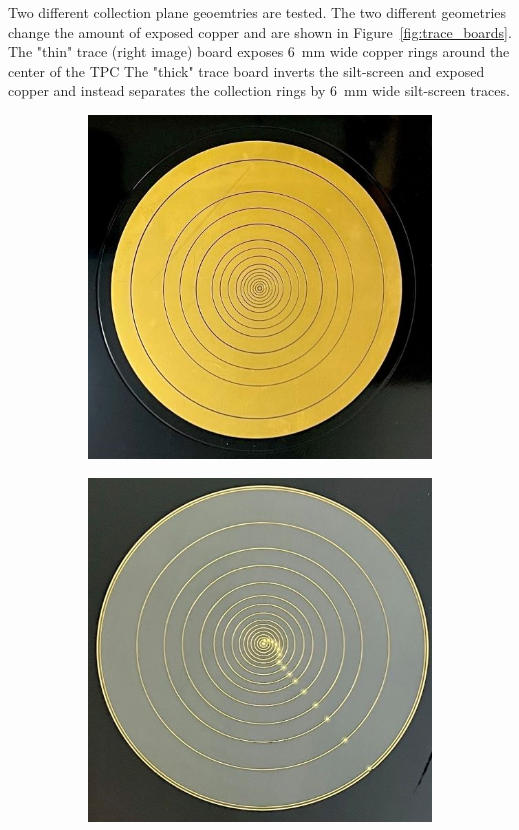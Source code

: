 Two different collection plane geoemtries are tested.
The two different geometries change the amount of exposed copper and are shown in Figure~\ref{fig:trace_boards}.
The "thin" trace (right image) board exposes 6~\unit{mm} wide copper rings around the center of the TPC
The "thick" trace board inverts the silt-screen and exposed copper and instead separates the collection rings by 6~\unit{mm} wide silt-screen traces.

\begin{figure}[]
\centering
\begin{subfigure}{.45\textwidth}
  \centering
  \includegraphics[width=\textwidth]{images/thick_board_example.jpg}
  \caption{}
\end{subfigure}%
\begin{subfigure}{.45\textwidth}
  \centering
  \includegraphics[width=\textwidth]{images/thin_trace_board_example.jpg}

\end{subfigure}
\end{figure}
